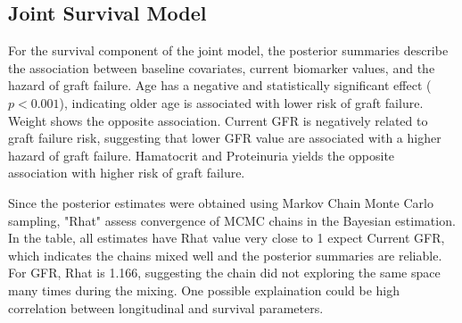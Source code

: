 \documentclass[11pt]{article}
\begin{document}
\subsection*{Joint Survival Model}
\begin{table}[ht]
\centering
\renewcommand{\arraystretch}{1.25}
\setlength{\tabcolsep}{8pt}
\caption{Posterior summaries for the survival submodel of the joint model.}
\label{tab:survival}
\end{table}

For the survival component of the joint model, the posterior summaries describe the association between baseline covariates, current biomarker values, and the hazard of graft failure. Age has a negative and statistically significant effect ($p<0.001$), indicating older age is associated with lower risk of graft failure. Weight shows the opposite association. Current GFR is negatively related to graft failure risk, suggesting that lower GFR value are associated with a higher hazard of graft failure. Hamatocrit and Proteinuria yields the opposite association with higher risk of graft failure. 

Since the posterior estimates were obtained using Markov Chain Monte Carlo sampling, "Rhat" assess convergence of MCMC chains in the Bayesian estimation. In the table, all estimates have Rhat value very close to 1 expect Current GFR, which indicates the chains mixed well and the posterior summaries are reliable. For GFR, Rhat is 1.166, suggesting the chain did not exploring the same space many times during the mixing. One possible explaination could be high correlation between longitudinal and survival parameters.
\end{document}
